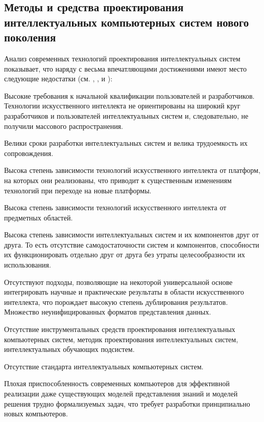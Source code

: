 
\begin{partbacktext}
\part{Методы и средства проектирования интеллектуальных компьютерных систем нового поколения}
\noindent
Анализ современных технологий проектирования интеллектуальных систем показывает, что
наряду с весьма впечатляющими достижениями имеют место следующие недостатки (см. , ,  и ):
\begin{textitemize}
	\item{Высокие требования к начальной квалификации пользователей и разработчиков. Технологии искусственного интеллекта не ориентированы на широкий круг разработчиков и пользователей интеллектуальных систем и, следовательно, не получили массового распространения.}
	\item{Велики сроки разработки интеллектуальных систем и велика трудоемкость их сопровождения.}
	\item{Высока степень зависимости технологий искусственного интеллекта от платформ, на которых они реализованы, что приводит к существенным изменениям технологий при переходе на новые платформы.}
	\item{Высока степень зависимости технологий искусственного интеллекта от предметных областей.}
	\item{Высока степень зависимости интеллектуальных систем и их компонентов друг от друга. То есть отсутствие самодостаточности систем и компонентов, способности их функционировать отдельно друг от друга без утраты целесообразности их использования.}
	\item{Отсутствуют подходы, позволяющие на некоторой универсальной основе интегрировать научные и практические результаты в области искусственного интеллекта, что порождает высокую степень дублирования результатов. Множество неунифицированных форматов представления данных.}
	\item{Отсутствие инструментальных средств проектирования интеллектуальных компьютерных систем, методик проектирования интеллектуальных систем, интеллектуальных обучающих подсистем.}
	\item{Отсутствие стандарта интеллектуальных компьютерных систем.}
	\item{Плохая приспособленность современных компьютеров для эффективной реализации даже существующих моделей представления знаний и моделей решения трудно формализуемых задач, что требует разработки принципиально новых компьютеров.}
\end{textitemize}


\end{partbacktext}
